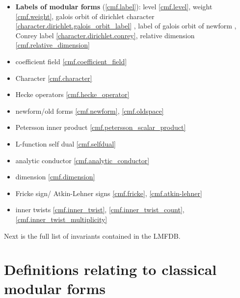 \begin{itemize}
    \item \textbf{Labels of modular forms} (\ref{cmf.label}): level \ref{cmf.level}, weight \ref{cmf.weight},
    galois orbit of dirichlet character \ref{character.dirichlet.galois_orbit_label} , label of galois orbit of newform \label{cmf.galois_orbit}, Conrey label \ref{character.dirichlet.conrey}, relative dimension \ref{cmf.relative_dimension}
    \item coefficient field \ref{cmf.coefficient_field}
    \item Character \ref{cmf.character}
    \item Hecke operators \ref{cmf.hecke_operator}
    \item newform/old forms \ref{cmf.newform}, \ref{cmf.oldspace}
    \item Petersson inner product \ref{cmf.petersson_scalar_product}
    \item L-function self dual \ref{cmf.selfdual}
    \item analytic conductor \ref{cmf.analytic_conductor}
    \item dimension \ref{cmf.dimension}
    \item Fricke sign/ Atkin-Lehner signs \ref{cmf.fricke}, \ref{cmf.atkin-lehner}
    \item inner twists \ref{cmf.inner_twist}, \ref{cmf.inner_twist_count}, \ref{cmf.inner_twist_multiplicity}
\end{itemize}

Next is the full list of invariants contained in the LMFDB.

\section{Definitions relating to classical modular forms}


